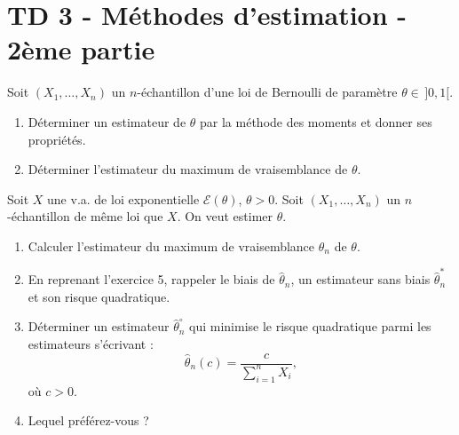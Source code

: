 \chapter*{TD 3 - Méthodes d'estimation - 2ème partie}

\setcounter{exercice}{0}

\begin{mdframed}
\begin{exercice}
Soit $(X_1, \dots, X_n)$ un $n$-échantillon d'une loi de Bernoulli de paramètre $\theta \in \, ]0, 1[$.
\begin{enumerate}
    \item Déterminer un estimateur de $\theta$ par la méthode des moments et donner ses propriétés.
    \item Déterminer l'estimateur du maximum de vraisemblance de $\theta$.
\end{enumerate}
\end{exercice}
\end{mdframed}

\smallskip

\begin{mdframed}
\begin{exercice}
Soit $X$ une v.a. de loi exponentielle $\mathcal{E}(\theta)$, $\theta > 0$. Soit $(X_1, \dots, X_n)$ un $n$-échantillon de même loi que $X$. On veut estimer $\theta$.
\begin{enumerate}
    \item Calculer l'estimateur du maximum de vraisemblance $\hat{\theta}_n$ de $\theta$.
    \item En reprenant l'exercice 5, rappeler le biais de $\hat{\theta}_n$, un estimateur sans biais $\hat{\theta}_n^*$ et son risque quadratique.
    \item Déterminer un estimateur $\hat{\theta}_n^\circ$ qui minimise le risque quadratique parmi les estimateurs s'écrivant :
    \begin{equation*}
    \hat{\theta}_n(c) = \frac{c}{\sum_{i=1}^n X_i},
    \end{equation*}
    où $c > 0$.
    \item Lequel préférez-vous ?
\end{enumerate}
\end{exercice}
\end{mdframed}

\smallskip


